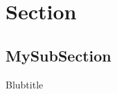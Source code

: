 \documentclass{beamer}
\begin{document}
    \section{Section}
    \subsection{MySubSection}
    \begin{frame}{Blubtitle}
        
    \end{frame}
\end{document}
